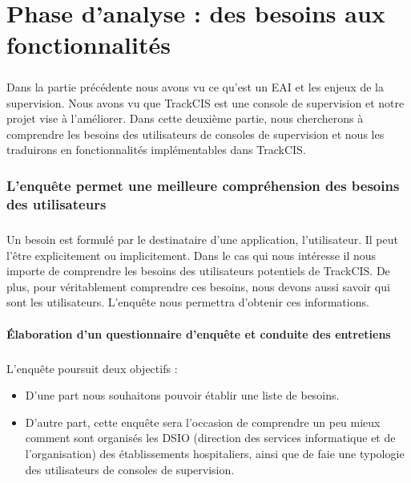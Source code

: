 \chapter{Phase d'analyse : des besoins aux fonctionnalités}
	\paragraph{}
	Dans la partie précédente nous avons vu ce qu'est un EAI et les enjeux de la
	supervision. Nous avons vu que TrackCIS est une console de supervision et
	notre projet vise à l'améliorer.
	Dans cette deuxième partie, nous chercherons à comprendre les besoins des
	utilisateurs de consoles de supervision et nous les traduirons en
	fonctionnalités implémentables dans TrackCIS.
	
	\subsection{L'enquête permet une meilleure compréhension des besoins des utilisateurs}
		\paragraph{}
		Un besoin est formulé par le destinataire d'une application, l'utilisateur. Il
		peut l'être explicitement ou implicitement. Dans le cas qui nous intéresse il
		nous importe de comprendre les besoins des utilisateurs potentiels de
		TrackCIS. De plus, pour véritablement comprendre ces besoins, nous devons
		aussi savoir qui sont les utilisateurs. L'enquête nous permettra d'obtenir ces
		informations.
		
		\subsubsection{Élaboration d'un questionnaire d'enquête et conduite des entretiens}
			\paragraph{}%
			L'enquête poursuit deux objectifs :
			\begin{itemize}
			  \item D’une part nous souhaitons pouvoir établir une liste de besoins.
			  \item D’autre part, cette enquête sera l’occasion de comprendre un peu
			  mieux comment sont organisés les DSIO (direction des services informatique
			  et de l’organisation) des établissements hospitaliers, ainsi que de faie
			  une typologie des utilisateurs de consoles de supervision.
			\end{itemize}
			
